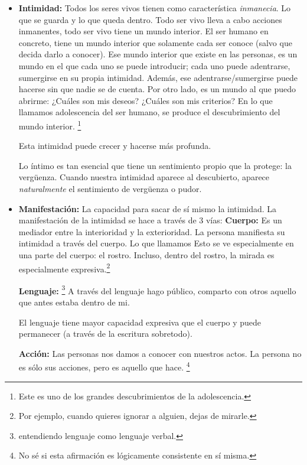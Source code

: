 \documentclass[palatino]{apuntesURJC}
\begin{document}
\begin{itemize}
	\item \textbf{Intimidad:} Todos los seres vivos tienen como característica \textit{inmanecia}.
	Lo que se guarda y lo que queda dentro.
	Todo ser vivo lleva a cabo acciones inmanentes, todo ser vivo tiene un mundo interior.
	El ser humano en concreto, tiene un mundo interior que solamente cada ser conoce (salvo que decida darlo a conocer).
	Ese mundo interior que existe en las personas, es un mundo en el que cada uno se puede introducir; cada uno puede adentrarse, sumergirse en su propia intimidad.
	Además, ese adentrarse/sumergirse puede hacerse sin que nadie se de cuenta.
	Por otro lado, es un mundo al que puedo abrirme: ¿Cuáles son mis deseos? ¿Cuáles son mis criterios?
	En lo que llamamos adolescencia del ser humano, se produce el descubrimiento del mundo interior. \footnote{Este es uno de los grandes descubrimientos de la adolescencia.}

	\subitem Esta intimidad puede crecer y hacerse más profunda.

	\subitem Lo íntimo es tan esencial que tiene un sentimiento propio que la protege: la vergüenza.
	Cuando nuestra intimidad aparece al descubierto, aparece \textit{naturalmente} el sentimiento de vergüenza o pudor.

	\item \textbf{Manifestación:} La capacidad para sacar de sí mismo la intimidad.
	La manifestación de la intimidad se hace a través de 3 vías:
	\subitem \textbf{Cuerpo: } Es un mediador entre la interioridad y la exterioridad. La persona manifiesta su intimidad a través del cuerpo.
	Lo que llamamos 
	Esto se ve especialmente en una parte del cuerpo: el rostro.
	Incluso, dentro del rostro, la mirada es especialmente expresiva.\footnote{Por ejemplo, cuando quieres ignorar a alguien, dejas de mirarle.}


	\subitem \textbf{Lenguaje:} \footnote{entendiendo lenguaje como lenguaje verbal.}
	A través del lenguaje hago público, comparto con otros aquello que antes estaba dentro de mi.

	El lenguaje tiene mayor capacidad expresiva que el cuerpo y puede permanecer (a través de la escritura sobretodo).

	\subitem \textbf{Acción:}
	Las personas nos damos a conocer con nuestros actos.
	La persona no es sólo sus acciones, pero es aquello que hace. \footnote{No sé si esta afirmación es lógicamente consistente en sí misma.}


\end{itemize}
\end{document}
